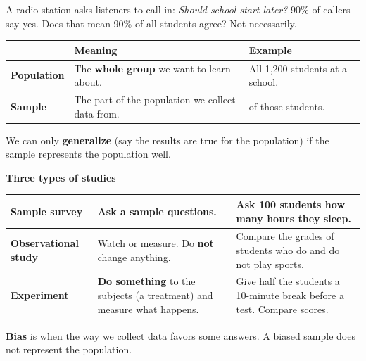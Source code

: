 \documentclass[11pt]{article}
\begin{document}

A radio station asks listeners to call in: \textit{Should school start later?} 90\% of callers say yes.
Does that mean 90\% of all students agree? Not necessarily.

\vspace{0.6em}
\renewcommand{\arraystretch}{1.3}
\begin{tabular}{|>{\raggedright\arraybackslash}p{1.3in}|>{\raggedright\arraybackslash}p{2.6in}|>{\raggedright\arraybackslash}p{2.5in}|}\hline
 & \textbf{Meaning} & \textbf{Example}\\ \hline
\textbf{Population} & The \textbf{whole group} we want to learn about. & All 1,200 students at a school.\\ \hline
\textbf{Sample} & The part of the population we collect data from. & 100 of those students.\\ \hline
\end{tabular}

\vspace{0.4em}
We can only \textbf{generalize} (say the results are true for the population) if the sample represents the population well.

\vspace{0.8em}
\textbf{Three types of studies}

\vspace{0.3em}
\begin{tabular}{|>{\raggedright\arraybackslash}p{1.3in}|>{\raggedright\arraybackslash}p{2.6in}|>{\raggedright\arraybackslash}p{2.5in}|}\hline
\textbf{Sample survey} & Ask a sample questions. & Ask 100 students how many hours they sleep.\\ \hline
\textbf{Observational study} & Watch or measure. Do \textbf{not} change anything. & Compare the grades of students who do and do not play sports.\\ \hline
\textbf{Experiment} & \textbf{Do something} to the subjects (a treatment) and measure what happens. & Give half the students a 10-minute break before a test. Compare scores.\\ \hline
\end{tabular}

\vspace{0.8em}
\textbf{Bias} is when the way we collect data favors some answers. A biased sample does not represent the population.
\end{document}
